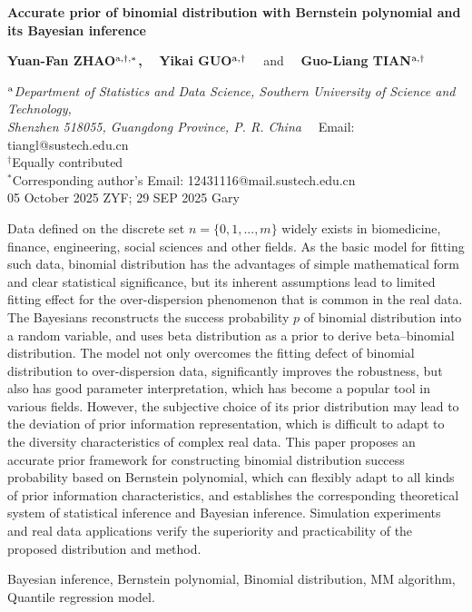 
\begin{flushleft}
{\Large \bf Accurate prior of binomial distribution with Bernstein polynomial and its Bayesian inference}
\end{flushleft}

\smallskip
\begin{flushleft}
{\bf Yuan-Fan ZHAO$^{{\rm a}, \dag, *}$,} \ \
{\bf Yikai GUO$^{{\rm a}, \dag}$}   \ \  and \ \
{\bf Guo-Liang TIAN$^{{\rm a}, \dag}$}  \ \

\vkL
{\small \it $^{\rm a}$Department of Statistics and Data Science,
                      Southern University of Science and Technology,} \\
{\small \it Shenzhen 518055, Guangdong Province, P. R. China} \ \
\textsf{Email:  tiangl@sustech.edu.cn}  \\

\vkL
{\small  $^{\dag}$Equally contributed} \\
{\small  $^*$Corresponding author's \textsf{Email: 12431116@mail.sustech.edu.cn}} \\
{\small \textsf{05 October 2025 ZYF; 29 SEP 2025 Gary}}
\end{flushleft}

\baselineskip 0.30in \vskip 0.05in \noi {\bf Abstract:}  Data defined on the discrete set $n=\{0,1,..., m\}$ widely exists in biomedicine, finance, engineering, social sciences and other fields. As the basic model for fitting such data, binomial distribution has the advantages of simple mathematical form and clear statistical significance, but its inherent assumptions lead to limited fitting effect for the over-dispersion phenomenon that is common in the real data. The Bayesians reconstructs the success probability $p$ of binomial distribution into a random variable, and uses beta distribution as a prior to derive beta--binomial distribution. The model not only overcomes the fitting defect of binomial distribution to over-dispersion data, significantly improves the robustness, but also has good parameter interpretation, which has become a popular tool in various fields. However, the subjective choice of its prior distribution may lead to the deviation of prior information representation, which is difficult to adapt to the diversity characteristics of complex real data. This paper proposes an accurate prior framework for constructing binomial distribution success probability based on Bernstein polynomial, which can flexibly adapt to all kinds of prior information characteristics, and establishes the corresponding theoretical system of statistical inference and Bayesian inference. Simulation experiments and real data applications verify the superiority and practicability of the proposed distribution and method.

\vkL {}   Bayesian inference, Bernstein polynomial, Binomial distribution, MM algorithm, Quantile regression model.

\baselineskip 0.30in
\setcounter{equation}{0} 